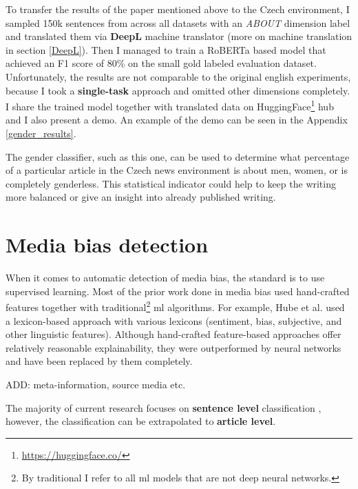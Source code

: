 To transfer the results of the paper mentioned above to the Czech environment, I sampled 150k sentences from across all datasets with an \textit{ABOUT} dimension label and translated them via \textbf{DeepL} machine translator (more on machine translation in section \ref{DeepL}). Then I managed to train a RoBERTa based model that achieved an F1 score of 80\% on the small gold labeled evaluation dataset. 
Unfortunately, the results are not comparable to the original english experiments, because I took a \textbf{single-task} approach and omitted other dimensions completely. I share the trained model together with translated data on HuggingFace\footnote{\url{https://huggingface.co/}} hub and I also present a demo. An example of the demo can be seen in the Appendix \ref{gender_results}.

The gender classifier, such as this one, can be used to determine what percentage of a particular article in the Czech news environment is about men, women, or is completely genderless. This statistical indicator could help to keep the writing more balanced or give an insight into already published writing.





\section{Media bias detection}\label{mediabias}
When it comes to automatic detection of media bias, the standard is to use supervised learning. Most of the prior work done in media bias used hand-crafted features together with traditional\footnote{By traditional I refer to all \Gls{ml} models that are not deep neural networks.} \Gls{ml} algorithms. For example, Hube et al. \cite{hube2018detecting} used a lexicon-based approach with various lexicons (sentiment, bias, subjective, and other linguistic features). Although hand-crafted feature-based approaches offer relatively reasonable explainability, they were outperformed by neural networks and have been replaced by them completely.


ADD: meta-information, source media etc.

The majority of current research focuses on \textbf{sentence level} classification \cite{sinha2021determining,Spinde2021MBIC,lee2021unifying,hube2019neural}, however, the classification can be extrapolated to \textbf{article level}.

